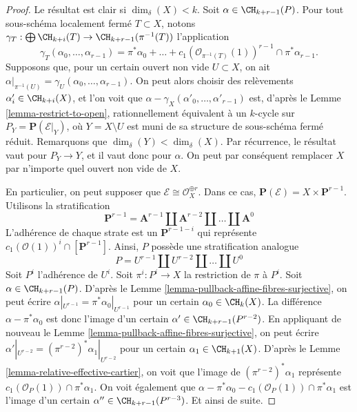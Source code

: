 \begin{proof}
\medskip\noindent
Le résultat est clair si $\dim_\delta(X) < k$.
Soit $\alpha \in \CH_{k + r - 1}(P)$.
Pour tout sous-schéma localement fermé $T \subset X$, notons
$\gamma_T : \bigoplus \CH_{k + i}(T) \to \CH_{k + r - 1}(\pi^{-1}(T))$
l'application
$$
\gamma_T(\alpha_0, \ldots, \alpha_{r - 1})
= \pi^*\alpha_0 + \ldots +
c_1(\mathcal{O}_{\pi^{-1}(T)}(1))^{r - 1} \cap \pi^*\alpha_{r - 1}.
$$
Supposons que, pour un certain ouvert non vide $U \subset X$, on ait
$\alpha|_{\pi^{-1}(U)} = \gamma_U(\alpha_0, \ldots, \alpha_{r - 1})$.
On peut alors choisir des relèvements $\alpha'_i \in \CH_{k + i}(X)$, et l'on
voit que $\alpha - \gamma_X(\alpha'_0, \ldots, \alpha'_{r - 1})$
est, d'après le Lemme \ref{lemma-restrict-to-open},
rationnellement équivalent à un $k$-cycle sur $P_Y = \mathbf{P}(\mathcal{E}|_Y)$,
où $Y = X \setminus U$ est muni de sa structure de sous-schéma fermé réduit.
Remarquons que $\dim_\delta(Y) < \dim_\delta(X)$.
Par récurrence, le résultat vaut
pour $P_Y \to Y$, et il vaut donc pour $\alpha$.
On peut par conséquent remplacer $X$ par n'importe quel ouvert non vide de $X$.

\medskip\noindent
En particulier, on peut supposer que $\mathcal{E} \cong \mathcal{O}_X^{\oplus r}$.
Dans ce cas, $\mathbf{P}(\mathcal{E}) = X \times \mathbf{P}^{r - 1}$.
Utilisons la stratification
$$
\mathbf{P}^{r - 1} = \mathbf{A}^{r - 1}
\amalg \mathbf{A}^{r - 2}
\amalg \ldots
\amalg \mathbf{A}^0
$$
L'adhérence de chaque strate est un $\mathbf{P}^{r - 1 - i}$ qui représente
$c_1(\mathcal{O}(1))^i \cap [\mathbf{P}^{r - 1}]$.
Ainsi, $P$ possède une stratification analogue
$$
P = U^{r - 1} \amalg U^{r - 2} \amalg \ldots \amalg U^0
$$
Soit $P^i$ l'adhérence de $U^i$. Soit $\pi^i : P^i \to X$
la restriction de $\pi$ à $P^i$.
Soit $\alpha \in \CH_{k + r - 1}(P)$. D'après le
Lemme \ref{lemma-pullback-affine-fibres-surjective},
on peut écrire $\alpha|_{U^{r - 1}} = \pi^*\alpha_0|_{U^{r - 1}}$
pour un certain $\alpha_0 \in \CH_k(X)$. La différence
$\alpha - \pi^*\alpha_0$ est donc l'image d'un certain
$\alpha' \in \CH_{k + r - 1}(P^{r - 2})$.
En appliquant de nouveau le Lemme \ref{lemma-pullback-affine-fibres-surjective},
on peut écrire
$\alpha'|_{U^{r - 2}} = (\pi^{r - 2})^*\alpha_1|_{U^{r - 2}}$
pour un certain $\alpha_1 \in \CH_{k + 1}(X)$.
D'après le Lemme \ref{lemma-relative-effective-cartier},
on voit que l'image de $(\pi^{r - 2})^*\alpha_1$
représente $c_1(\mathcal{O}_P(1)) \cap \pi^*\alpha_1$.
On voit également que
$\alpha - \pi^*\alpha_0 - c_1(\mathcal{O}_P(1)) \cap \pi^*\alpha_1$
est l'image d'un certain $\alpha'' \in \CH_{k + r - 1}(P^{r - 3})$.
Et ainsi de suite.
\end{proof}

